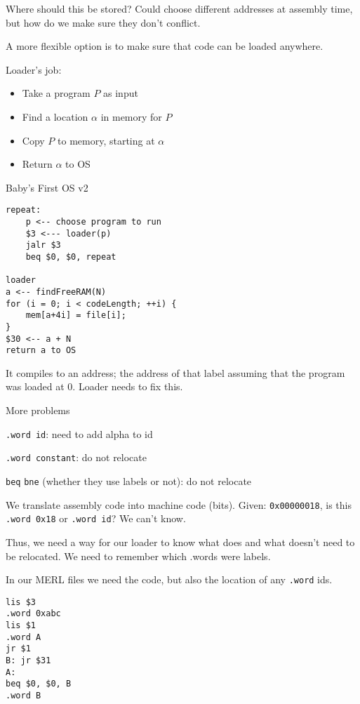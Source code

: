 \documentclass{article}
\begin{document}
Where should this be stored? Could choose different addresses at
assembly time, but how do we make sure they don't conflict.

A more flexible option is to make sure that code can be loaded anywhere.

Loader's job:
\begin{itemize}
    \item Take a program \(P\) as input 
    \item Find a location \(\alpha\) in memory for \(P\)
    \item Copy \(P\) to memory, starting at \(\alpha\)
    \item Return \(\alpha\) to OS
\end{itemize}

Baby's First OS v2

\begin{tcolorbox}
\begin{verbatim}
repeat:
    p <-- choose program to run
    $3 <--- loader(p)
    jalr $3
    beq $0, $0, repeat

loader
a <-- findFreeRAM(N)
for (i = 0; i < codeLength; ++i) {
    mem[a+4i] = file[i];
}
$30 <-- a + N
return a to OS
\end{verbatim}
\end{tcolorbox}


It compiles to an address; the address of that label assuming that the
program was loaded at 0. Loader needs to fix this.

More problems

\texttt{.word\ id}: need to add alpha to id

\texttt{.word\ constant}: do not relocate

\texttt{beq} \texttt{bne} (whether they use labels or not): do not
relocate

We translate assembly code into machine code (bits). Given:
\texttt{0x00000018}, is this \texttt{.word\ 0x18} or \texttt{.word\ id}?
We can't know.

Thus, we need a way for our loader to know what does and what doesn't
need to be relocated. We need to remember which .words were labels.

In our MERL files we need the code, but also the location of any
\texttt{.word} ids.

\begin{tcolorbox}
\begin{verbatim}
lis $3
.word 0xabc
lis $1
.word A
jr $1
B: jr $31
A: 
beq $0, $0, B
.word B
\end{verbatim}
\end{tcolorbox}
\end{document}
